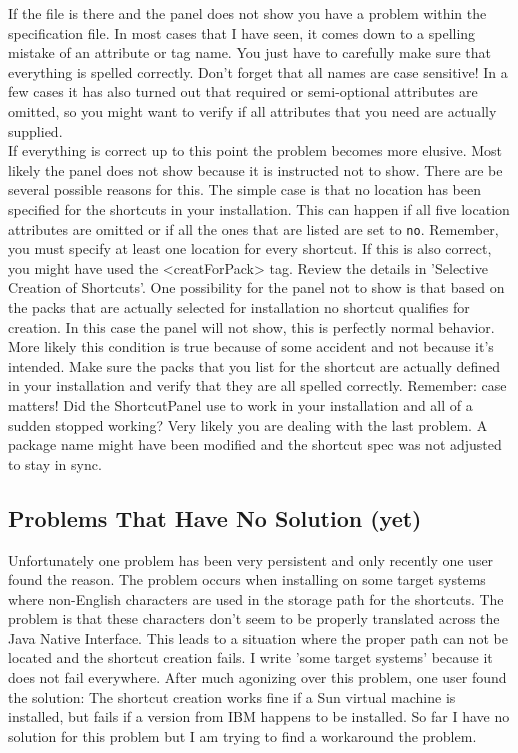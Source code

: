 If the file is there and the panel does not show you have a problem
within the specification file. In most cases that I have seen, it comes
down to a spelling mistake of an attribute or tag name. You just have to
carefully make sure that everything is spelled correctly. Don't forget
that all names are case sensitive! In a few cases it has also turned out
that required or semi-optional attributes are omitted, so you might want
to verify if all attributes that you need are actually supplied.\\

If everything is correct up to this point the problem becomes more
elusive.  Most likely the panel does not show because it is instructed
not to show. There are be several possible reasons for this. The simple
case is that no location has been specified for the shortcuts in your
installation. This can happen if all five location attributes are
omitted or if all the ones that are listed are set to \texttt{no}.
Remember, you must specify at least one location for every shortcut. If
this is also correct, you might have used the <creatForPack> tag. Review
the details in 'Selective Creation of Shortcuts'. One possibility for
the panel not to show is that based on the packs that are actually
selected for installation no shortcut qualifies for creation. In this
case the panel will not show, this is perfectly normal behavior. More
likely this condition is true because of some accident and not because
it's intended. Make sure the packs that you list for the shortcut are
actually defined in your installation and verify that they are all
spelled correctly. Remember: case matters! Did the ShortcutPanel use to
work in your installation and all of a sudden stopped working? Very
likely you are dealing with the last problem. A package name might have
been modified and the shortcut spec was not adjusted to stay in sync.\\

\subsection{Problems That Have No Solution (yet)}

Unfortunately one problem has been very persistent and only recently one
user found the reason. The problem occurs when installing on some target
systems where non-English characters are used in the storage path for
the shortcuts. The problem is that these characters don't seem to be
properly translated across the Java Native Interface. This leads to a
situation where the proper path can not be located and the shortcut
creation fails. I write 'some target systems' because it does not fail
everywhere. After much agonizing over this problem, one user found the
solution: The shortcut creation works fine if a Sun virtual machine is
installed, but fails if a version from IBM happens to be installed. So
far I have no solution for this problem but I am trying to find a
workaround the problem.\\
